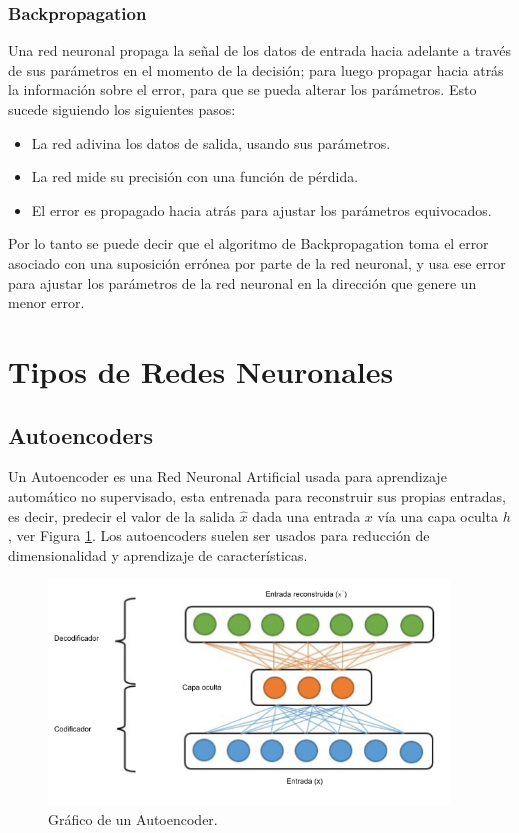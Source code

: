 \subsubsection{Backpropagation}

Una red neuronal propaga la se\~{n}al de los datos de entrada hacia adelante a trav\'{e}s de sus par\'{a}metros en el momento de la decisi\'{o}n; para luego propagar hacia atr\'{a}s la informaci\'{o}n sobre el error, para que se pueda alterar los par\'{a}metros. Esto sucede siguiendo los siguientes pasos:

\begin{itemize}
\item La red adivina los datos de salida, usando sus par\'{a}metros.
\item La red mide su precisi\'{o}n con una funci\'{o}n de p\'{e}rdida.
\item El error es propagado hacia atr\'{a}s para ajustar los par\'{a}metros equivocados.
\end{itemize}

Por lo tanto se puede decir que el algoritmo de Backpropagation toma el error asociado con una suposición errónea por parte de la red neuronal, y usa ese error para ajustar los parámetros de la red neuronal en la dirección que genere un menor error.

\section{Tipos de Redes Neuronales}

\subsection{Autoencoders}

Un Autoencoder es una Red Neuronal Artificial usada para aprendizaje autom\'{a}tico no supervisado, esta entrenada para reconstruir sus propias entradas, es decir, predecir el valor de la salida $\hat{x}$ dada una entrada $x$ v\'{i}a una capa oculta $h$, ver Figura \ref{fig:autoencoder}. Los autoencoders suelen ser usados para reducci\'{o}n de dimensionalidad y aprendizaje de caracter\'{i}sticas. 

\begin{figure}[h!]
  \begin{center}	\includegraphics[width=0.95\textwidth]{imagenes/Cap4/autoencoder}
  \caption{Gr\'{a}fico de un Autoencoder.}
  \label{fig:autoencoder}
  \end{center}
\end{figure}

